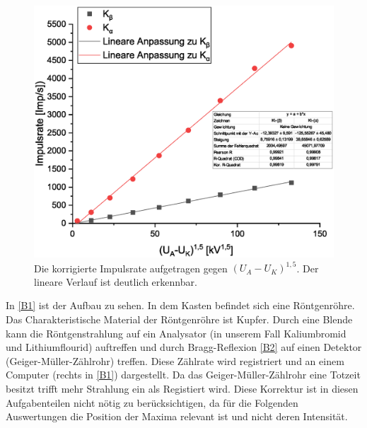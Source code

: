 \documentclass[
	a4paper,
	12pt,
	pagesize,
	ngerman
]{scrartcl}
\begin{document}
\begin{figure}[h!]
	\centering
	\includegraphics[scale = 0.6]{spannung2.eps}
	\caption{Die korrigierte Impulsrate aufgetragen gegen $(U_A-U_K)^{1,5}$. Der lineare Verlauf ist deutlich erkennbar.}
	\label{spannung2}
\end{figure}
In \cref{B1} ist der Aufbau zu sehen. In dem Kasten befindet sich eine Röntgenröhre. Das Charakteristische Material der Röntgenröhre ist Kupfer. Durch eine Blende kann die Röntgenstrahlung auf ein Analysator (in unserem Fall Kaliumbromid und Lithiumflourid) auftreffen und durch Bragg-Reflexion \cref{B2} auf einen Detektor (Geiger-Müller-Zählrohr) treffen. Diese Zählrate wird registriert und an einem Computer (rechts in \cref{B1}) dargestellt. Da das Geiger-Müller-Zählrohr eine Totzeit besitzt trifft mehr Strahlung ein als Registiert wird. Diese Korrektur ist in diesen Aufgabenteilen nicht nötig zu berücksichtigen, da für die Folgenden Auswertungen die Position der Maxima relevant ist und nicht deren Intensität.
\end{document}

